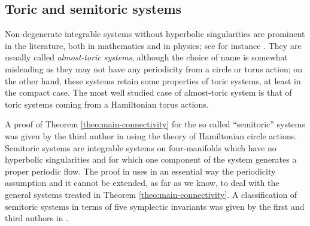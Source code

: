 \documentclass[11pt]{article}
\begin{document}
\subsection*{Toric and semitoric systems}

Non-degenerate integrable systems without hyperbolic singularities are
prominent in the literature, both in mathematics and in physics; see
for instance \cite{Ba2009, Sy2010,VN2007}.  They are usually called
\emph{almost-toric systems}, although the choice of name is somewhat
misleading as they may not have any periodicity from a circle or torus
action; on the other hand, these systems retain some properties of
toric systems, at least in the compact case. The most well studied
case of almost-toric system is that of toric systems coming from a
Hamiltonian torus actions.


A proof of Theorem \ref{theo:main-connectivity} for the so called
``semitoric'' systems was given by the third author in \cite{VN2007}
using the theory of Hamiltonian circle actions.  Semitoric systems are
integrable systems on four-manifolds which have no hyperbolic
singularities and for which one component of the system generates a
proper periodic flow. The proof in \cite{VN2007} uses in an essential
way the periodicity assumption and it cannot be extended, as far as we
know, to deal with the general systems treated in Theorem
\ref{theo:main-connectivity}. A classification of semitoric systems in
terms of five symplectic invariants was given by the first and third
authors in \cite{PeVN2009, PeVN2011}.
\end{document}
